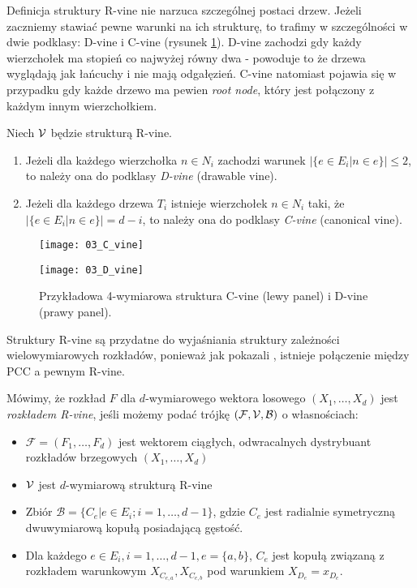 Definicja struktury R-vine nie narzuca szczególnej postaci drzew. Jeżeli zaczniemy stawiać pewne warunki na ich strukturę, to trafimy w szczególności w dwie podklasy: D-vine i C-vine (rysunek \ref{fig:d_vine_c_vine}). D-vine zachodzi gdy każdy wierzchołek ma stopień co najwyżej równy dwa - powoduje to że drzewa wyglądają jak łańcuchy i nie mają odgałęzień. C-vine natomiast pojawia się w przypadku gdy każde drzewo ma pewien \emph{root node}, który jest połączony z każdym innym wierzchołkiem.
\begin{df}
	Niech $\mathcal{V}$ będzie strukturą R-vine.
	\begin{enumerate}
		\item Jeżeli dla każdego wierzchołka $n\in N_i$ zachodzi warunek $\vert \{e\in E_i\vert n\in e\}\vert \leqslant 2$, to należy ona do podklasy \emph{D-vine} (drawable vine).
		\item Jeżeli dla każdego drzewa $T_i$ istnieje wierzchołek $n\in N_i$ taki, że $\vert \{e\in E_i\vert n\in e\}\vert = d-i$, to należy ona do podklasy \emph{C-vine} (canonical vine).
	\end{enumerate}
\end{df}


\begin{figure}[h]
	\centering
	\begin{minipage}{0.35\linewidth}
	\texttt{[image: 03\_C\_vine]}
	\end{minipage}	
	\begin{minipage}{0.45\linewidth}
	\texttt{[image: 03\_D\_vine]}
	\end{minipage}	

	\caption{Przykładowa 4-wymiarowa struktura C-vine (lewy panel) i D-vine (prawy panel). \label{fig:d_vine_c_vine}}
\end{figure}

Struktury R-vine są przydatne do wyjaśniania struktury zależności wielowymiarowych rozkładów, ponieważ jak pokazali \cite{BedfordCooke2002}, istnieje połączenie między PCC a pewnym R-vine.

\begin{df}
	Mówimy, że rozkład $F$ dla $d$-wymiarowego wektora losowego $(X_1, \dots, X_d)$ jest \emph{rozkładem R-vine}, jeśli możemy podać trójkę $(\mathcal{F}, \mathcal{V}, \mathcal{B})$ o własnościach:
	\begin{itemize}
		\item $\mathcal{F} =(F_1, \dots, F_d)$ jest wektorem ciągłych, odwracalnych dystrybuant rozkładów brzegowych $(X_1, \dots, X_d)$
		\item $\mathcal{V}$ jest $d$-wymiarową strukturą R-vine 
		\item Zbiór $\mathcal{B} = \{C_e\vert e \in E_i; i=1,\dots,d-1\}$, gdzie $C_e$ jest radialnie symetryczną dwuwymiarową kopułą posiadającą gęstość.
		\item Dla każdego $e\in E_i, i=1, \dots, d-1, e=\{a,b\}$, $C_e$ jest kopułą związaną z rozkładem warunkowym $X_{C_{e, a}}, X_{C_{e, b}}$ pod warunkiem $X_{D_e} = x_{D_e}$.
	\end{itemize}
	\label{def:r_vine_distribution}
\end{df}


